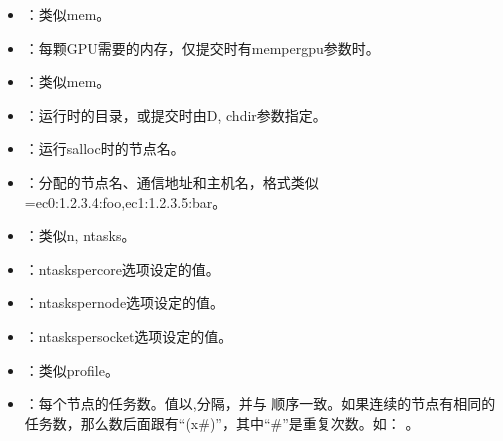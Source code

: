 \documentclass[a4paper,12pt,english]{sphinxmanual}
\begin{document}
\begin{itemize}
\item {} 
\sphinxAtStartPar
{}：类似\sphinxhyphen{}\sphinxhyphen{}mem。

\item {} 
\sphinxAtStartPar
{}：每颗GPU需要的内存，仅提交时有\sphinxhyphen{}\sphinxhyphen{}mem\sphinxhyphen{}per\sphinxhyphen{}gpu参数时。

\item {} 
\sphinxAtStartPar
{}：类似\sphinxhyphen{}\sphinxhyphen{}mem。

\item {} 
\sphinxAtStartPar
{}：运行时的目录，或提交时由\sphinxhyphen{}D, \sphinxhyphen{}\sphinxhyphen{}chdir参数指定。

\item {} 
\sphinxAtStartPar
{}：运行salloc时的节点名。

\item {} 
\sphinxAtStartPar
{}：分配的节点名、通信地址和主机名，格式类似 =ec0:1.2.3.4:foo,ec1:1.2.3.5:bar。

\item {} 
\sphinxAtStartPar
{}：类似\sphinxhyphen{}n, \sphinxhyphen{}\sphinxhyphen{}ntasks。

\item {} 
\sphinxAtStartPar
{}：\sphinxhyphen{}\sphinxhyphen{}ntasks\sphinxhyphen{}per\sphinxhyphen{}core选项设定的值。

\item {} 
\sphinxAtStartPar
{}：\sphinxhyphen{}\sphinxhyphen{}ntasks\sphinxhyphen{}per\sphinxhyphen{}node选项设定的值。

\item {} 
\sphinxAtStartPar
{}：\sphinxhyphen{}\sphinxhyphen{}ntasks\sphinxhyphen{}per\sphinxhyphen{}socket选项设定的值。

\item {} 
\sphinxAtStartPar
{}：类似\sphinxhyphen{}\sphinxhyphen{}profile。

\item {} 
\sphinxAtStartPar
{}：每个节点的任务数。值以,分隔，并与 顺序一致。如果连续的节点有相同的任务数，那么数后面跟有“(x\#)”，其中“\#”是重复次数。如：  。

\end{itemize}
\end{document}
